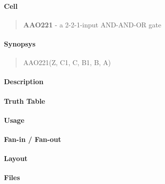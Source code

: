\label{AAO221}
\paragraph{Cell}
\begin{quote}
    \textbf{AAO221} - a 2-2-1-input AND-AND-OR gate
\end{quote}

\paragraph{Synopsys}
\begin{quote}
    AAO221(Z, C1, C, B1, B, A)
\end{quote}

\paragraph{Description}

%

\paragraph{Truth Table}
%

\paragraph{Usage}

\paragraph{Fan-in / Fan-out}

\paragraph{Layout}

\paragraph{Files}
